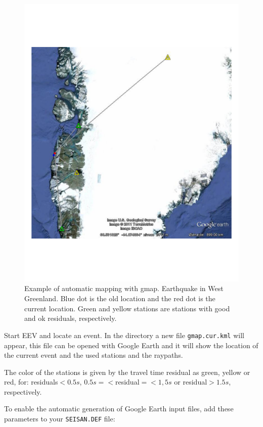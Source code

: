 \begin{figure}
\centerline{\includegraphics[width=0.9\linewidth]{fig/gmap-cur-kml}}
\caption{Example of automatic mapping with gmap. Earthquake in 
West Greenland. 
Blue dot is the old location and the red dot is the current location.
Green and yellow stations are stations with good and ok residuals, respectively.}
\label{fig:gmap.cur.kml}
\end{figure}

Start EEV and locate an event. In the directory a new file \texttt{gmap.cur.kml} 
will appear, this file can be opened with Google Earth and it will show 
the location of the current event and the used stations and the raypaths.

The color of the stations is given by the travel time residual as green, yellow or red,
for: residuals$<0.5s$, $0.5s=<$residual$=<1,5s$ or residual$>1.5s$, respectively.

To enable the automatic generation of Google Earth input files, add these parameters to your \texttt{SEISAN.DEF} file:

\begin{small}

\end{small}

